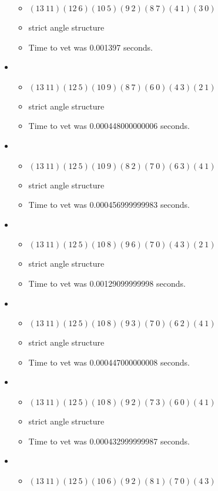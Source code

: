 \documentclass{article}
\begin{document}
\begin{itemize}
\begin{itemize}
      \item $(13\ 11)(12\ 6)(10\ 5)(9\ 2)(8\ 7)(4\ 1)(3\ 0)$
      \item strict angle structure
      \item Time to vet was 0.001397 seconds.
\end{itemize}
\item \begin{itemize}
      \item $(13\ 11)(12\ 5)(10\ 9)(8\ 7)(6\ 0)(4\ 3)(2\ 1)$
      \item strict angle structure
      \item Time to vet was 0.000448000000006 seconds.
\end{itemize}
\item \begin{itemize}
      \item $(13\ 11)(12\ 5)(10\ 9)(8\ 2)(7\ 0)(6\ 3)(4\ 1)$
      \item strict angle structure
      \item Time to vet was 0.000456999999983 seconds.
\end{itemize}
\item \begin{itemize}
      \item $(13\ 11)(12\ 5)(10\ 8)(9\ 6)(7\ 0)(4\ 3)(2\ 1)$
      \item strict angle structure
      \item Time to vet was 0.00129099999998 seconds.
\end{itemize}
\item \begin{itemize}
      \item $(13\ 11)(12\ 5)(10\ 8)(9\ 3)(7\ 0)(6\ 2)(4\ 1)$
      \item strict angle structure
      \item Time to vet was 0.000447000000008 seconds.
\end{itemize}
\item \begin{itemize}
      \item $(13\ 11)(12\ 5)(10\ 8)(9\ 2)(7\ 3)(6\ 0)(4\ 1)$
      \item strict angle structure
      \item Time to vet was 0.000432999999987 seconds.
\end{itemize}
\item \begin{itemize}
      \item $(13\ 11)(12\ 5)(10\ 6)(9\ 2)(8\ 1)(7\ 0)(4\ 3)$

\end{itemize}
\end{itemize}
\end{document}
